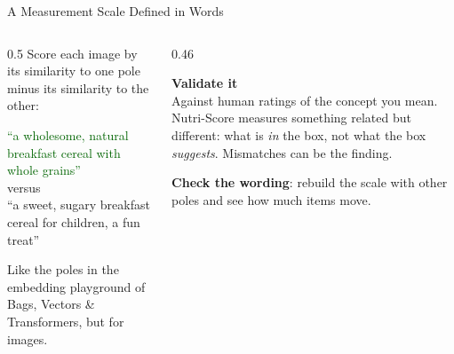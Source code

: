 \begin{frame}{A Measurement Scale Defined in Words}
\begin{columns}[T]
\begin{column}{0.5\textwidth}
Score each image by its similarity to one pole minus its similarity to the other:

\vspace{0.1cm}
{\footnotesize
\textcolor{darkgreen}{``a wholesome, natural breakfast cereal with whole grains''}\\
\hspace{1.5cm}versus\\
\textcolor{warnborder}{``a sweet, sugary breakfast cereal for children, a fun treat''}}

\vspace{0.2cm}
Like the poles in the embedding playground of Bags, Vectors \& Transformers, but for images.
\end{column}
\begin{column}{0.46\textwidth}
\begin{greenbox}
\textbf{Validate it}\\
Against human ratings of the concept you mean. Nutri-Score measures something related but
different: what is \emph{in} the box, not what the box \emph{suggests}. Mismatches can be the
finding.
\end{greenbox}
\begin{graybox}
\textbf{Check the wording}: rebuild the scale with other poles and see how much items move.
\end{graybox}
\end{column}
\end{columns}
\end{frame}

